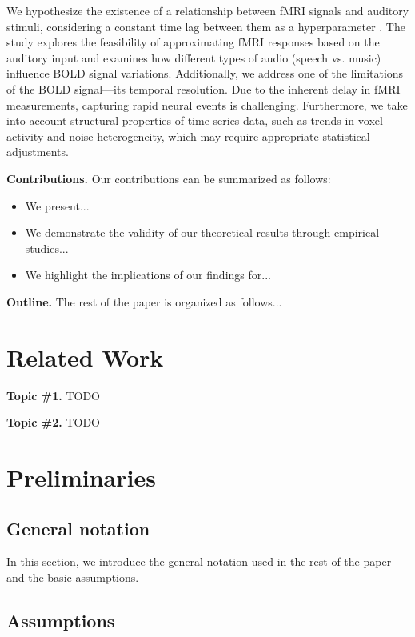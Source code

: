 \documentclass{article}
\begin{document}
We hypothesize the existence of a relationship between fMRI signals and auditory stimuli, considering a constant time lag between them as a hyperparameter \cite{article6}. The study explores the feasibility of approximating fMRI responses based on the auditory input and examines how different types of audio (speech vs. music) influence BOLD signal variations. Additionally, we address one of the limitations of the BOLD signal—its temporal resolution. Due to the inherent delay in fMRI measurements, capturing rapid neural events is challenging. Furthermore, we take into account structural properties of time series data, such as trends in voxel activity and noise heterogeneity, which may require appropriate statistical adjustments.




\textbf{Contributions.} Our contributions can be summarized as follows:
\begin{itemize}
    \item We present...
    \item We demonstrate the validity of our theoretical results through empirical studies...
    \item We highlight the implications of our findings for...
\end{itemize}

\textbf{Outline.} The rest of the paper is organized as follows...

\section{Related Work}\label{sec:rw}

\textbf{Topic \#1.}
TODO

\textbf{Topic \#2.}
TODO

\section{Preliminaries}\label{sec:prelim}

\subsection{General notation}

In this section, we introduce the general notation used in the rest of the paper and the basic assumptions. 

\subsection{Assumptions} 
\end{document}
